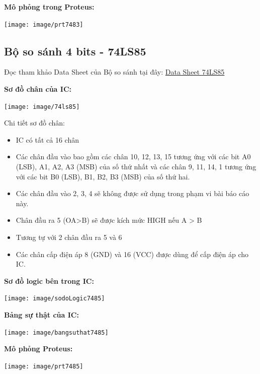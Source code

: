 \documentclass[10pt,a4paper]{report}
\begin{document}
\textbf{Mô phỏng trong Proteus:}
\begin{center}
	\texttt{[image: image/prt7483]}
\end{center}

\vspace{2cm}
\subsection{Bộ so sánh 4 bits - 74LS85}

Đọc tham khảo Data Sheet của Bộ so sánh tại đây: \hyperref{https://pdf1.alldatasheet.com/datasheet-pdf/view/12664/ONSEMI/74LS85.html}{category}{name}{Data Sheet 74LS85} %

\textbf{Sơ đồ chân của IC:}
\begin{center}
	\texttt{[image: image/74ls85]}
\end{center}

Chi tiết sơ đồ chân:
\begin{itemize}
	\item IC có tất cả 16 chân
	\item Các chân đầu vào bao gồm các chân 10, 12, 13, 15 tương ứng với các bit A0 (LSB), A1, A2, A3 (MSB) của số thứ nhất và các chân 9, 11, 14, 1 tương ứng với các bit B0 (LSB), B1, B2, B3 (MSB) của số thứ hai. 
	\item Các chân đầu vào 2, 3, 4 sẽ không được sử dụng trong phạm vi bài báo cáo này.
	\item Chân đầu ra 5 (OA>B) sẽ được kích mức HIGH nếu A > B
	\item Tương tự với 2 chân đầu ra 5 và 6
	\item Các chân cấp điện áp 8 (GND) và 16 (VCC) được dùng để cấp điện áp cho IC.
\end{itemize}

\begin{multicols}{2}
	\textbf{Sơ đồ logic bên trong IC: }
	\begin{center}
		\texttt{[image: image/sodoLogic7485]}
	\end{center}
	
	
	\textbf{Bảng sự thật của IC:}
	\begin{center}
		\texttt{[image: image/bangsuthat7485]}
	\end{center}
\end{multicols}


\textbf{Mô phỏng Proteus: }
\begin{center}
	\texttt{[image: image/prt7485]}
\end{center}
\end{document}
